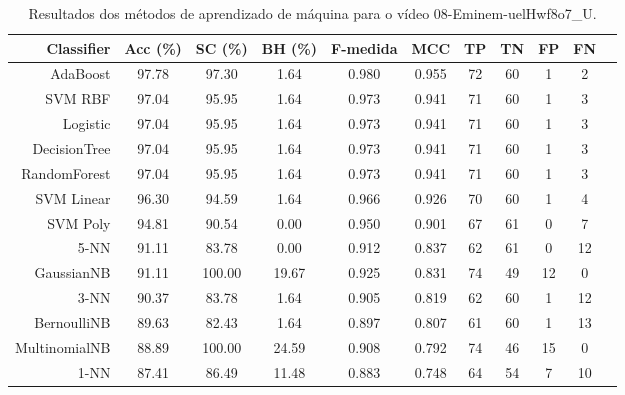 \begin{table}[!htb]
\centering
\caption{Resultados dos métodos de aprendizado de máquina para o vídeo 08-Eminem-uelHwf8o7_U.}
\label{tab:08-Eminem-uelHwf8o7_U}
\begin{tabular}{r|c|c|c|c|c|c|c|c|c|c}
\hline\hline
Classifier & Acc (\%) & SC (\%) & BH (\%) & F-medida & MCC & TP & TN & FP & FN \\ \hline
AdaBoost & 97.78 & 97.30 & 1.64 & 0.980 & 0.955 & 72 & 60 & 1 & 2 \\ 
SVM RBF & 97.04 & 95.95 & 1.64 & 0.973 & 0.941 & 71 & 60 & 1 & 3 \\ 
Logistic & 97.04 & 95.95 & 1.64 & 0.973 & 0.941 & 71 & 60 & 1 & 3 \\ 
DecisionTree & 97.04 & 95.95 & 1.64 & 0.973 & 0.941 & 71 & 60 & 1 & 3 \\ 
RandomForest & 97.04 & 95.95 & 1.64 & 0.973 & 0.941 & 71 & 60 & 1 & 3 \\ 
SVM Linear & 96.30 & 94.59 & 1.64 & 0.966 & 0.926 & 70 & 60 & 1 & 4 \\ 
SVM Poly & 94.81 & 90.54 & 0.00 & 0.950 & 0.901 & 67 & 61 & 0 & 7 \\ 
5-NN & 91.11 & 83.78 & 0.00 & 0.912 & 0.837 & 62 & 61 & 0 & 12 \\ 
GaussianNB & 91.11 & 100.00 & 19.67 & 0.925 & 0.831 & 74 & 49 & 12 & 0 \\ 
3-NN & 90.37 & 83.78 & 1.64 & 0.905 & 0.819 & 62 & 60 & 1 & 12 \\ 
BernoulliNB & 89.63 & 82.43 & 1.64 & 0.897 & 0.807 & 61 & 60 & 1 & 13 \\ 
MultinomialNB & 88.89 & 100.00 & 24.59 & 0.908 & 0.792 & 74 & 46 & 15 & 0 \\ 
1-NN & 87.41 & 86.49 & 11.48 & 0.883 & 0.748 & 64 & 54 & 7 & 10 \\ 
\hline\hline
\end{tabular}
\end{table}
